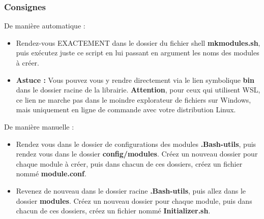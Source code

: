 \documentclass[a4paper,10pt]{article}
\begin{document}
\subsubsection{Consignes}\color{white}
De manière automatique :
\begin{itemize}
    \item Rendez-vous EXACTEMENT dans le dossier du fichier shell \textbf{\color{lime}mkmodules.sh}, puis exécutez juste\linebreak
    ce script en lui passant en argument les noms des modules à créer.\\[1\baselineskip]

    \item \textbf{Astuce :} Vous pouvez vous y rendre directement via le lien symbolique \textbf{\color{lime}bin} dans le dossier\linebreak
    racine de la librairie. \textbf{Attention}, pour ceux qui utilisent WSL, ce lien ne marche pas dans le\linebreak
    moindre explorateur de fichiers sur Windows, mais uniquement en ligne de commande\linebreak
    avec votre distribution Linux.\\[1\baselineskip]
\end{itemize}

De manière manuelle :
\begin{itemize}
    \item  Rendez vous dans le dossier de configurations des modules \textbf{\color{lime}.Bash-utils}, puis rendez vous dans\linebreak
    le dossier \textbf{\color{lime}config/modules}. Créez un nouveau dossier pour chaque module à créer, puis dans\linebreak
    chacun de ces dossiers, créez un fichier nommé \textbf{\color{lime}module.conf}.\\[1\baselineskip]

    \item Revenez de nouveau dans le dossier racine \textbf{\color{lime}.Bash-utils}, puis allez dans le dossier \textbf{\color{lime}modules}.\linebreak
    Créez un nouveau dossier pour chaque module, puis dans chacun de ces dossiers, créez un\linebreak
    fichier nommé \textbf{\color{lime}Initializer.sh}.
\end{itemize}

\end{document}
